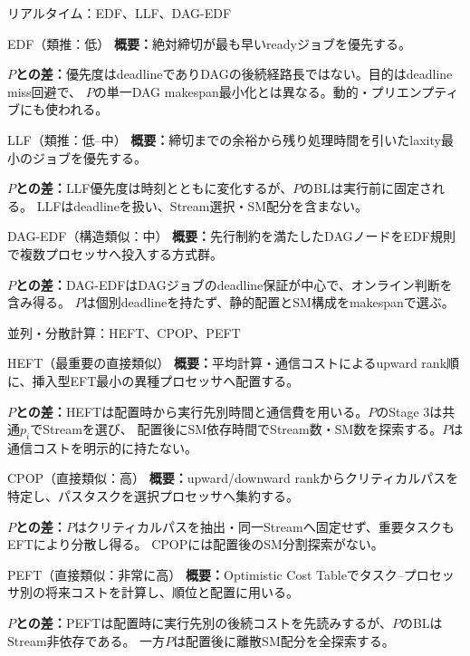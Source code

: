 \documentclass[aspectratio=169,10pt]{beamer}
\begin{document}
\begin{frame}{リアルタイム：EDF、LLF、DAG-EDF}
  \scriptsize
  \begin{block}{EDF（類推：低）}
    \textbf{概要：}絶対締切が最も早いreadyジョブを優先する。\par
    \textbf{$P$との差：}優先度はdeadlineでありDAGの後続経路長ではない。目的はdeadline miss回避で、
    $P$の単一DAG makespan最小化とは異なる。動的・プリエンプティブにも使われる。
  \end{block}
  \begin{block}{LLF（類推：低--中）}
    \textbf{概要：}締切までの余裕から残り処理時間を引いたlaxity最小のジョブを優先する。\par
    \textbf{$P$との差：}LLF優先度は時刻とともに変化するが、$P$のBLは実行前に固定される。
    LLFはdeadlineを扱い、Stream選択・SM配分を含まない。
  \end{block}
  \begin{block}{DAG-EDF（構造類似：中）}
    \textbf{概要：}先行制約を満たしたDAGノードをEDF規則で複数プロセッサへ投入する方式群。\par
    \textbf{$P$との差：}DAG-EDFはDAGジョブのdeadline保証が中心で、オンライン判断を含み得る。
    $P$は個別deadlineを持たず、静的配置とSM構成をmakespanで選ぶ。
  \end{block}
\end{frame}

\begin{frame}{並列・分散計算：HEFT、CPOP、PEFT}
  \scriptsize
  \begin{block}{HEFT（最重要の直接類似）}
    \textbf{概要：}平均計算・通信コストによるupward rank順に、挿入型EFT最小の異種プロセッサへ配置する。\par
    \textbf{$P$との差：}HEFTは配置時から実行先別時間と通信費を用いる。$P$のStage 3は共通$p_i$でStreamを選び、
    配置後にSM依存時間でStream数・SM数を探索する。$P$は通信コストを明示的に持たない。
  \end{block}
  \begin{block}{CPOP（直接類似：高）}
    \textbf{概要：}upward/downward rankからクリティカルパスを特定し、パスタスクを選択プロセッサへ集約する。\par
    \textbf{$P$との差：}$P$はクリティカルパスを抽出・同一Streamへ固定せず、重要タスクもEFTにより分散し得る。
    CPOPには配置後のSM分割探索がない。
  \end{block}
  \begin{block}{PEFT（直接類似：非常に高）}
    \textbf{概要：}Optimistic Cost Tableでタスク--プロセッサ別の将来コストを計算し、順位と配置に用いる。\par
    \textbf{$P$との差：}PEFTは配置時に実行先別の後続コストを先読みするが、$P$のBLはStream非依存である。
    一方$P$は配置後に離散SM配分を全探索する。
  \end{block}
\end{frame}
\end{document}
